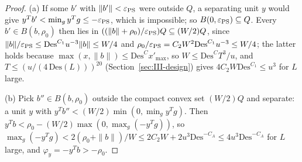 \documentclass[10pt]{amsart}
\theoremstyle{definition}
\theoremstyle{remark}
\begin{document}
\begin{proof}
(a) If some $b'$ with $\|b'\|<\varepsilon_{\rm PS}$ were outside $Q$, a separating
unit $y$ would give $y^Tb'<\min_gy^Tg\le-\varepsilon_{\rm PS}$, which is
impossible; so $B(0,\varepsilon_{\rm PS})\subseteq Q$.  Every $b'\in B(b,\rho_0)$
then lies in $((\|b\|+\rho_0)/\varepsilon_{\rm PS})Q\subseteq(W/2)Q$, since
$\|b\|/\varepsilon_{\rm PS}\le\mathrm{Des}^{C_1}u^{-3}\|b\|\le W/4$ and
$\rho_0/\varepsilon_{\rm PS}=C_2W^2\mathrm{Des}^{C_1}u^{-3}\le W/4$; the latter
holds because $\max(x,\|b\|)\le\mathrm{Des}^Cx'_{\max}$, so $W\le\mathrm{Des}^C
T^3/u$, and $T\le(u/(4\,\mathrm{Des}(L)))^{20}$ (Section~\ref{sec:III-design})
gives $4C_2W\mathrm{Des}^{C_1}\le u^3$ for $L$ large.

(b) Pick $b''\in B(b,\rho_0)$ outside the compact convex set $(W/2)Q$ and
separate: a unit $y$ with $y^Tb''<(W/2)\min(0,\min_gy^Tg)$.  Then $y^Tb<\rho_0-
(W/2)\max(0,\max_g(-y^Tg))$, so $\max_g(-y^Tg)<2(\rho_0+\|b\|)/W\le2C_2W+
2u^3\mathrm{Des}^{-C_A}\le4u^3\mathrm{Des}^{-C_A}$ for $L$ large, and
$\varphi_y=-y^Tb>-\rho_0$.


\end{proof}
\end{document}
